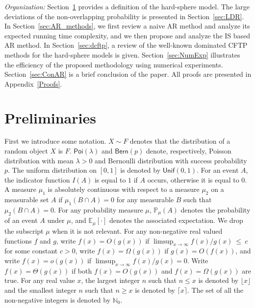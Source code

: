 \documentclass[11pt]{article}
\newcommand{\pp}{\mathbb{P}}
\newcommand{\ee}{\mathbb{E}}
\newcommand{\mbb}{\mathbb}
\newcommand{\pois}{\mathsf{Poi}}
\newcommand{\bern}{\mathsf{Bern}}
\newcommand{\unif}{\mathsf{Unif}}
\begin{document}
{\em Organization:} 
Section~\ref{sec:prel} provides a definition of the hard-sphere model. The large deviations of the non-overlapping probability is presented in Section~\ref{sec:LDR}.
In Section~\ref{sec:AR_methods}, we first review a naive AR method and analyze its expected running time complexity, and we then propose and analyze the IS based AR method. In Section~\ref{sec:dcftp}, a review of the well-known dominated CFTP methods for the hard-sphere models is given.
Section~\ref{sec:NumExp} illustrates the efficiency of the proposed methodology using numerical experiments.
Section~\ref{sec:ConAR} is a brief conclusion of the paper. All proofs are presented in Appendix~\ref{Proofs}.




\section{Preliminaries}
\label{sec:prel}

First we introduce some notation. $X \sim F$ denotes that the distribution of a random object $X$ is $F$. $\pois(\lambda)$ and $\bern(p)$ denote, respectively,
Poisson distribution with mean $\lambda > 0$ and Bernoulli distribution with success probability $p$.
The uniform distribution on $[0,1]$ is denoted by $\unif(0,1)$. For an event $A$, the indicator function $I(A)$ is equal to $1$ if $A$ occurs, otherwise it is equal to $0$.
A measure $\mu_1$ is absolutely continuous with respect to a measure $\mu_2$ on a measurable set $A$ if $\mu_1(B\cap A) = 0$ for any measurable $B$ such that
$\mu_2(B\cap A) = 0$. {For any probability measure $\mu$, $\pp_{\mu}(A)$ denotes the probability of an event $A$ under $\mu$,
and $\ee_{\mu}[\cdot]$ denotes the associated expectation. We drop the subscript $\mu$ when it is not relevant.} 
For any non-negative real valued functions $f$ and $g$, write $f(x) = O(g(x))$ if $\limsup_{x\rightarrow \infty} f(x)/g(x)~\leq~c$ for some constant $c > 0$, write $f(x) = \varOmega(g(x))$ if $g(x) = O(f(x))$, and write $f(x) = o(g(x))$ if $\limsup_{x\rightarrow \infty} f(x)/g(x) = 0 $.
Write $f(x) = \Theta(g(x))$ {if both} $f(x) = O(g(x))$ and $f(x) = \varOmega(g(x))$ are true. For any real value $x$, the largest integer $n$ such that $n \leq x$ is denoted by $\lfloor x\rfloor$ and the smallest integer $n$ such that $n \geq x$ is denoted by $\lceil x\rceil$. The set of all the non-negative integers is denoted by $\mbb{N}_0$.\\
\end{document}

